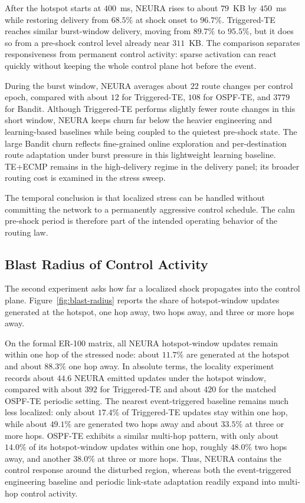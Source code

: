 \documentclass[5p,times]{elsarticle}
\begin{document}
After the hotspot starts at $400$~ms, NEURA rises to about $79$~KB by $450$~ms while restoring delivery from $68.5\%$ at shock onset to $96.7\%$. Triggered-TE reaches similar burst-window delivery, moving from $89.7\%$ to $95.5\%$, but it does so from a pre-shock control level already near $311$~KB. The comparison separates responsiveness from permanent control activity: sparse activation can react quickly without keeping the whole control plane hot before the event.

During the burst window, NEURA averages about $22$ route changes per control epoch, compared with about $12$ for Triggered-TE, $108$ for OSPF-TE, and $3779$ for Bandit. Although Triggered-TE performs slightly fewer route changes in this short window, NEURA keeps churn far below the heavier engineering and learning-based baselines while being coupled to the quietest pre-shock state. The large Bandit churn reflects fine-grained online exploration and per-destination route adaptation under burst pressure in this lightweight learning baseline. TE+ECMP remains in the high-delivery regime in the delivery panel; its broader routing cost is examined in the stress sweep.

The temporal conclusion is that localized stress can be handled without committing the network to a permanently aggressive control schedule. The calm pre-shock period is therefore part of the intended operating behavior of the routing law.



\subsection{Blast Radius of Control Activity}

The second experiment asks how far a localized shock propagates into the control plane. Figure~\ref{fig:blast-radius} reports the share of hotspot-window updates generated at the hotspot, one hop away, two hops away, and three or more hops away.

On the formal ER-100 matrix, all NEURA hotspot-window updates remain within one hop of the stressed node: about $11.7\%$ are generated at the hotspot and about $88.3\%$ one hop away. In absolute terms, the locality experiment records about $44.6$ NEURA emitted updates under the hotspot window, compared with about $392$ for Triggered-TE and about $420$ for the matched OSPF-TE periodic setting. The nearest event-triggered baseline remains much less localized: only about $17.4\%$ of Triggered-TE updates stay within one hop, while about $49.1\%$ are generated two hops away and about $33.5\%$ at three or more hops. OSPF-TE exhibits a similar multi-hop pattern, with only about $14.0\%$ of its hotspot-window updates within one hop, roughly $48.0\%$ two hops away, and another $38.0\%$ at three or more hops. Thus, NEURA contains the control response around the disturbed region, whereas both the event-triggered engineering baseline and periodic link-state adaptation readily expand into multi-hop control activity.
\end{document}
